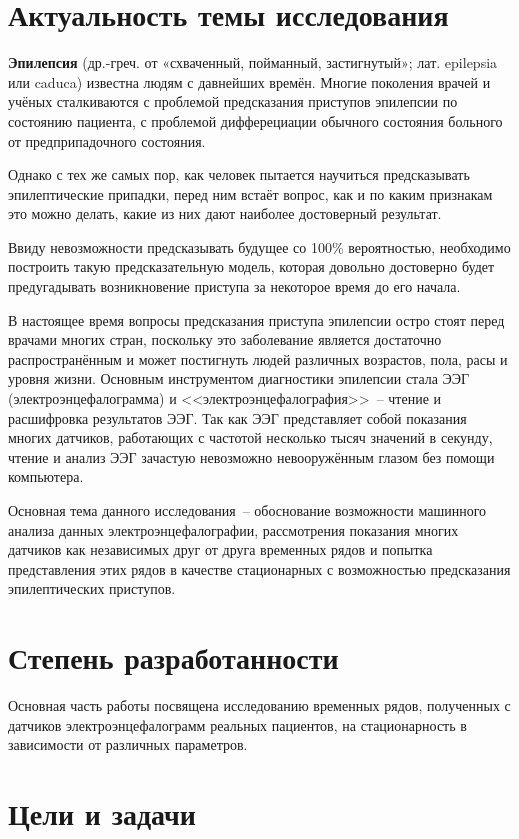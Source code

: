 \documentclass[a4paper,12pt]{report}
\begin{document}
\section{Актуальность темы исследования}

\textbf{Эпилепсия} (др.-греч. от «схваченный, пойманный, застигнутый»; лат. epilepsia или caduca) известна людям с давнейших времён. Многие поколения врачей и учёных сталкиваются с проблемой предсказания приступов эпилепсии по состоянию пациента, с проблемой дифферециации обычного состояния больного от предприпадочного состояния.

Однако с тех же самых пор, как человек пытается научиться предсказывать эпилептические припадки, перед ним встаёт вопрос, как и по каким признакам это можно делать, какие из них дают наиболее достоверный результат.

Ввиду невозможности предсказывать будущее со 100\% вероятностью, необходимо построить такую предсказательную модель, которая довольно достоверно будет предугадывать возникновение приступа за некоторое время до его начала.

В настоящее время вопросы предсказания приступа эпилепсии остро стоят перед врачами многих стран, поскольку это заболевание является достаточно распространённым и может постигнуть людей различных возрастов, пола, расы и уровня жизни. Основным инструментом диагностики эпилепсии стала ЭЭГ (электроэнцефалограмма) и <<электроэнцефалография>>~-- чтение и расшифровка результатов ЭЭГ. Так как ЭЭГ представляет собой показания многих датчиков, работающих с частотой несколько тысяч значений в секунду, чтение и анализ ЭЭГ зачастую невозможно невооружённым глазом без помощи компьютера.

Основная тема данного исследования~-- обоснование возможности машинного анализа данных электроэнцефалографии, рассмотрения показания многих датчиков как независимых друг от друга временных рядов и попытка представления этих рядов в качестве стационарных с возможностью предсказания эпилептических приступов.

\section{Степень разработанности}

Основная часть работы посвящена исследованию временных рядов, полученных с датчиков электроэнцефалограмм реальных пациентов, на стационарность в зависимости от различных параметров.

\section{Цели и задачи}
\end{document}
